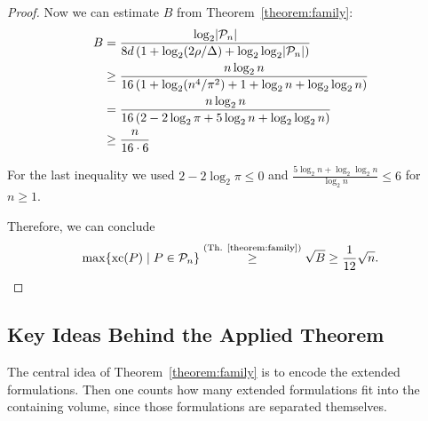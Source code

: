 \begin{proof}
  Now we can estimate $B$ from Theorem~\ref{theorem:family}:
  \begin{align*}
    B & = \frac{\log_2 \lvert\mathcal{P}_n\rvert}{8d \left(1 + \log_2 (2\rho/\Delta) + \log_2\log_2 \lvert\mathcal{P}_n\rvert \right)}   \\
      & \geq \frac{n \log_2 n}{16 \left(1 + \log_2 (n^4 / \pi^2) + 1 + \log_2 n + \log_2 \log_2 n \right)} \\
      & = \frac{n \log_2 n}{16 \left(2 - 2 \log_2 \pi + 5 \log_2 n + \log_2 \log_2 n \right)}              \\
      & \geq \frac{n}{16 \cdot 6}
  \end{align*}

  For the last inequality we used $2 - 2 \log_2 \pi \leq 0$ and $\frac{5 \log_2 n + \log_2 \log_2 n}{\log_2 n} \leq 6$ for $n \geq 1$.

  Therefore, we can conclude $$\max \{\operatorname{xc}(P) \mid P \in \mathcal{P}_n\} \stackrel{\text{(Th. \ref{theorem:family})}}{\geq} \sqrt{B} \geq \frac{1}{12} \sqrt{n} .$$
\end{proof}



\subsection{Key Ideas Behind the Applied Theorem}

The central idea of Theorem~\ref{theorem:family} is to encode the extended formulations. Then one counts how many extended formulations fit into the containing volume, since those formulations are separated themselves.

